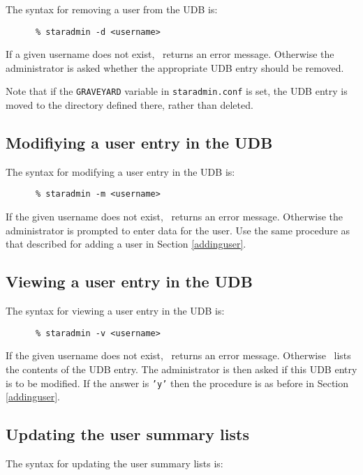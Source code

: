 The syntax for removing a user from the UDB is:

\begin{verbatim}
      % staradmin -d <username>
\end{verbatim}

If a given username does not exist, \staradmin\ returns an error message.
Otherwise the administrator is asked whether the appropriate UDB entry should
be removed.

Note that if the {\tt GRAVEYARD} variable in {\tt staradmin.conf} is set, the
UDB entry is moved to the directory defined there, rather than deleted.

\subsection{Modifiying a user entry in the UDB}

The syntax for modifying a user entry in the UDB is:

\begin{verbatim}
      % staradmin -m <username>
\end{verbatim}

If the given username does not exist, \staradmin\ returns an error message.
Otherwise the administrator is prompted to enter data for the user. Use the
same procedure as that described for adding a user in Section \ref{addinguser}.

\subsection{Viewing a user entry in the UDB}

The syntax for viewing a user entry in the UDB is:

\begin{verbatim}
      % staradmin -v <username>
\end{verbatim}

If the given username does not exist, \staradmin\ returns an error message.
Otherwise \staradmin\ lists the contents of the UDB entry. The administrator is
then asked if this UDB entry is to be modified. If the answer is {\tt 'y'}
then the procedure is as before in Section \ref{addinguser}.

\subsection{Updating the user summary lists}

The syntax for updating the user summary lists is:

